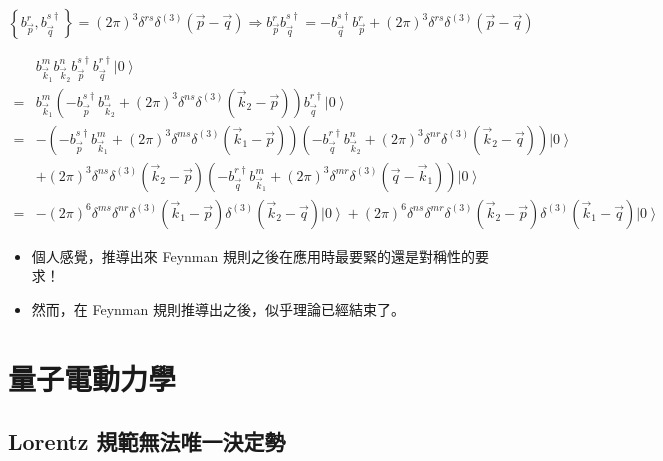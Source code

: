\documentclass{article}
\begin{document}
$$
  \left\{b_{\vec{p}}^r,b_{\vec{q}}^{s\dagger}\right\}=(2\pi)^3\delta^{rs}\delta^{(3)}(\vec{p}-\vec{q})\Rightarrow b_{\vec{p}}^rb_{\vec{q}}^{s\dagger}=-b_{\vec{q}}^{s\dagger}b_{\vec{p}}^r+(2\pi)^3\delta^{rs}\delta^{(3)}(\vec{p}-\vec{q})
$$

$$
  \begin{aligned}
      & b_{\vec{k}_1}^mb_{\vec{k}_2}^nb_{\vec{p}}^{s\dagger}b_{\vec{q}}^{r\dagger}\left|0\right\rangle                                                                                                                                     \\
    = & b_{\vec{k}_1}^m\left(-b_{\vec{p}}^{s\dagger}b_{\vec{k}_2}^n+(2\pi)^3\delta^{ns}\delta^{(3)}\left(\vec{k}_2-\vec{p}\right)\right)b_{\vec{q}}^{r\dagger}\left|0\right\rangle                                                         \\
    = & -\left(-b_{\vec{p}}^{s\dagger}b_{\vec{k}_1}^m+(2\pi)^3\delta^{ms}\delta^{(3)}(\vec{k}_1-\vec{p})\right)\left(-b_{\vec{q}}^{r\dagger}b_{\vec{k}_2}^n+(2\pi)^3\delta^{nr}\delta^{(3)}(\vec{k}_2-\vec{q})\right)\left|0\right\rangle  \\
      & +(2\pi)^3\delta^{ns}\delta^{(3)}\left(\vec{k}_2-\vec{p}\right)\left(-b_{\vec{q}}^{r\dagger}b_{\vec{k}_1}^{m}+(2\pi)^3\delta^{mr}\delta^{(3)}(\vec{q}-\vec{k}_1)\right)\left|0\right\rangle                                         \\
    = & -(2\pi)^6\delta^{ms}\delta^{nr}\delta^{(3)}(\vec{k}_1-\vec{p})\delta^{(3)}(\vec{k}_2-\vec{q})\left|0\right\rangle+(2\pi)^6\delta^{ns}\delta^{mr}\delta^{(3)}(\vec{k}_2-\vec{p})\delta^{(3)}(\vec{k}_1-\vec{q})\left|0\right\rangle
  \end{aligned}
$$

\begin{itemize}
  \item 個人感覺，推導出來 Feynman 規則之後在應用時最要緊的還是對稱性的要求！
  \item 然而，在 Feynman 規則推導出之後，似乎理論已經結束了。
\end{itemize}

\section{量子電動力學}

\subsection{Lorentz 規範無法唯一決定勢}
\end{document}
